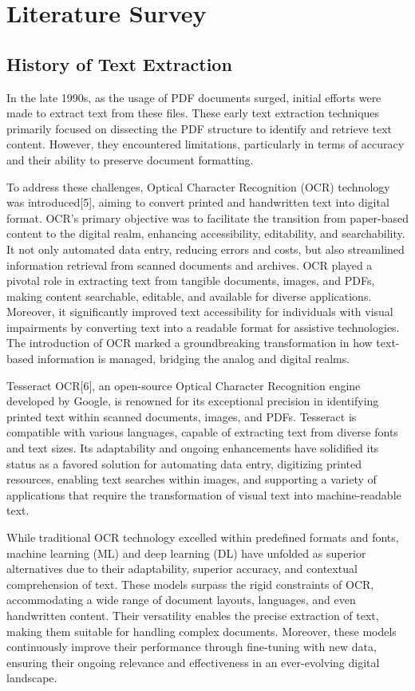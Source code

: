 \documentclass[conference]{IEEEtran}
\begin{document}
\section{Literature Survey}

\subsection{History of Text Extraction}

In the late 1990s, as the usage of PDF documents surged, initial efforts were made to extract text from these files. These early text extraction techniques primarily focused on dissecting the PDF structure to identify and retrieve text content. However, they encountered limitations, particularly in terms of accuracy and their ability to preserve document formatting. 

To address these challenges, Optical Character Recognition (OCR) technology was introduced[5], aiming to convert printed and handwritten text into digital format. OCR's primary objective was to facilitate the transition from paper-based content to the digital realm, enhancing accessibility, editability, and searchability. It not only automated data entry, reducing errors and costs, but also streamlined information retrieval from scanned documents and archives. OCR played a pivotal role in extracting text from tangible documents, images, and PDFs, making content searchable, editable, and available for diverse applications. Moreover, it significantly improved text accessibility for individuals with visual impairments by converting text into a readable format for assistive technologies. The introduction of OCR marked a groundbreaking transformation in how text-based information is managed, bridging the analog and digital realms.

Tesseract OCR[6], an open-source Optical Character Recognition engine developed by Google, is renowned for its exceptional precision in identifying printed text within scanned documents, images, and PDFs. Tesseract is compatible with various languages, capable of extracting text from diverse fonts and text sizes. Its adaptability and ongoing enhancements have solidified its status as a favored solution for automating data entry, digitizing printed resources, enabling text searches within images, and supporting a variety of applications that require the transformation of visual text into machine-readable text.

While traditional OCR technology excelled within predefined formats and fonts, machine learning (ML) and deep learning (DL) have unfolded as superior alternatives due to their adaptability, superior accuracy, and contextual comprehension of text. These models surpass the rigid constraints of OCR, accommodating a wide range of document layouts, languages, and even handwritten content. Their versatility enables the precise extraction of text, making them suitable for handling complex documents. Moreover, these models continuously improve their performance through fine-tuning with new data, ensuring their ongoing relevance and effectiveness in an ever-evolving digital landscape.
\end{document}
